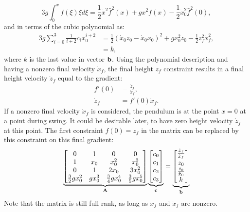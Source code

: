 \begin{equation}
		3g\int_{0}^xf(\xi)\xi d\xi =\frac{1}{2}\dot{x}^2\bar{f}^2(x)+gx^2f(x) - \frac{1}{2}\dot{x}_0^2\bar{f}^2(0),
\end{equation}
and in terms of the cubic polynomial as:
\begin{align}
	3g\sum_{i=0}^3\frac{1}{i+2}c_ix_0^{i+2}& = \frac{1}{2}(\dot{x}_0z_0-\dot{x}_0x_0)^2 + gx_0^2z_0 - \frac{1}{2}z_f^2\dot{x}_f^2,\\
	&=k,
\end{align}
where $k$ is the last value in vector $\mathbf{b}$. Using the polynomial description and having a nonzero final velocity $\dot{x}_f$, the final height $z_f$ constraint results in a final height velocity $\dot{z}_f$ equal to the gradient:
\begin{align}
 	f'(0) &= \frac{\dot{z}_f}{\dot{x}_f},\\
 	\dot{z}_f &= f'(0)\dot{x}_f.
\end{align}
If a nonzero final velocity $\dot{x}_f$ is considered, the pendulum is at the point $x=0$ at a point during swing. It could be desirable later, to have zero height velocity $\dot{z}_f$ at this point. The first constraint $f(0)=z_f$ in the matrix can be replaced by this constraint on this final gradient:
\begin{equation}
    \underbrace{\begin{bmatrix}0 & 1 & 0 & 0 \\ 
     1 & x_0 & x_0^2 & x_0^3\\
     0 & 1 & 2x_0 & 3x_0^2\\
     \frac{3}{2}gx_0^2 & gx_0^3 & \frac{3}{4}gx_0^4 & \frac{3}{5}gx_0^5\\
     \end{bmatrix}}_{\mathbf{A}}
     \underbrace{\begin{bmatrix}
     c_0\\
     c_1\\
     c_2\\
     c_3\\
     \end{bmatrix}}_{\mathbf{c}}=
     \underbrace{\begin{bmatrix}
    \frac{\dot{z}_f}{\dot{x}_f}\\
     z_0\\
     \frac{\dot{z}_0}{\dot{x}_0}\\
     k\\
     \end{bmatrix}}_{\mathbf{b}}
\end{equation}
Note that the matrix is still full rank, as long as $x_f$ and $\dot{x}_f$ are nonzero.

